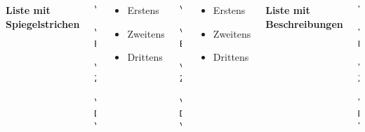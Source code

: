 \begin{frame}[fragile]
	\begin{columns}
	\textbf{	Liste mit Spiegelstrichen}
			\begin{lstlisting}
\begin{itemize}
	\item Erstens
	\item Zweitens
	\item Drittens 
\end{itemize}
			\end{lstlisting}
			\begin{outputbox}
				\begin{itemize}
					\item Erstens
					\item Zweitens
					\item Drittens 
				\end{itemize}
			\end{outputbox}		
			\begin{lstlisting}
\begin{itemize}
	\item[Erstens] Erstens
	\item[Zweitens] Zweitens
	\item[Drittens] Drittens
\end{itemize}
\end{lstlisting}
\begin{outputbox}
	\begin{itemize}
		\item[Erstens] Erstens
		\item[Zweitens] Zweitens
		\item[Drittens] Drittens
	\end{itemize}
\end{outputbox}		
		\textbf{Liste mit Beschreibungen}
			\begin{lstlisting}
\begin{eqlist}
	\item Erstens
	\item Zweitens
	\item Drittens 
\end{eqlist}
			\end{lstlisting}

\end{columns}
\end{frame}
